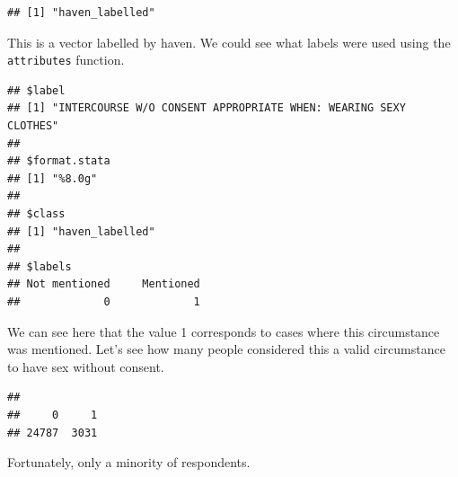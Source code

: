 \documentclass[]{book}
\newenvironment{Shaded}{\begin{snugshade}}{\end{snugshade}}
\newcommand{\DecValTok}[1]{\textcolor[rgb]{0.00,0.00,0.81}{#1}}
\newcommand{\KeywordTok}[1]{\textcolor[rgb]{0.13,0.29,0.53}{\textbf{#1}}}
\newcommand{\NormalTok}[1]{#1}
\newcommand{\OperatorTok}[1]{\textcolor[rgb]{0.81,0.36,0.00}{\textbf{#1}}}
\theoremstyle{definition}
\theoremstyle{definition}
\theoremstyle{definition}
\theoremstyle{remark}
\begin{document}
\begin{Shaded}
\end{Shaded}

\begin{verbatim}
## [1] "haven_labelled"
\end{verbatim}

This is a vector labelled by haven. We could see what labels were used
using the \texttt{attributes} function.

\begin{Shaded}
\end{Shaded}

\begin{verbatim}
## $label
## [1] "INTERCOURSE W/O CONSENT APPROPRIATE WHEN: WEARING SEXY CLOTHES"
## 
## $format.stata
## [1] "%8.0g"
## 
## $class
## [1] "haven_labelled"
## 
## $labels
## Not mentioned     Mentioned 
##             0             1
\end{verbatim}

We can see here that the value 1 corresponds to cases where this
circumstance was mentioned. Let's see how many people considered this a
valid circumstance to have sex without consent.

\begin{Shaded}
\end{Shaded}

\begin{verbatim}
## 
##     0     1 
## 24787  3031
\end{verbatim}

Fortunately, only a minority of respondents.
\end{document}

